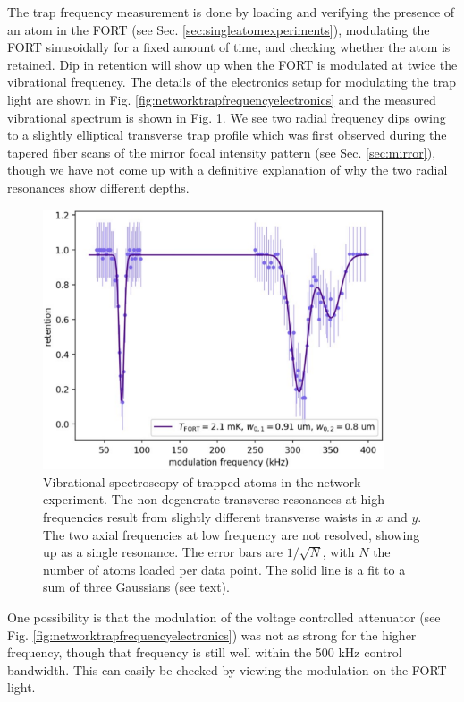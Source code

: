 The trap frequency measurement is done by loading and verifying the presence of an atom in the FORT (see Sec. \ref{sec:singleatomexperiments}), modulating the FORT sinusoidally for a fixed amount of time, and checking whether the atom is retained. Dip in retention will show up when the FORT is modulated at twice the vibrational frequency. The details of the electronics setup for modulating the trap light are shown in Fig. \ref{fig:networktrapfrequencyelectronics} and the measured vibrational spectrum is shown in Fig. \ref{fig:networktrapfrequencies}. We see two radial frequency dips owing to a slightly elliptical transverse trap profile which was first observed during the tapered fiber scans of the mirror focal intensity pattern (see Sec. \ref{sec:mirror}), though we have not come up with a definitive explanation of why the two radial resonances show different depths. 
\begin{figure}[!ht]
    \centering
    \includegraphics[width=0.9\textwidth]{Images/network_trap_frequencies_20240627.pdf}
    \caption{Vibrational spectroscopy of trapped atoms in the network experiment. The non-degenerate transverse resonances at high frequencies result from slightly different transverse waists in $x$ and $y$. The two axial frequencies at low frequency are not resolved, showing up as a single resonance. The error bars are $1/\sqrt{N}$, with $N$ the number of atoms loaded per data point. The solid line is a fit to a sum of three Gaussians (see text).}
    \label{fig:networktrapfrequencies}
\end{figure}
One possibility is that the modulation of the voltage controlled attenuator (see Fig. \ref{fig:networktrapfrequencyelectronics}) was not as strong for the higher frequency, though that frequency is still well within the 500 kHz control bandwidth. This can easily be checked by viewing the modulation on the FORT light.
    
